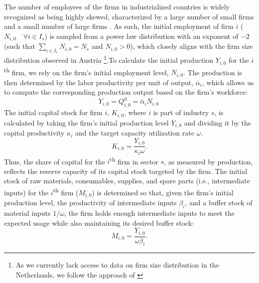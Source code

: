 The number of employees of the firms in industrialized countries is widely recognized as being highly skewed, characterized by a large number of small firms and a small number of large firms \citep{axtell2001zipf}. As such, the initial employment of firm $i$ ($N_{i,0} \quad \forall i \in I_{s}$) is sampled from a power law distribution with an exponent of $-2$ (such that $\sum_{i \in I_{s}} N_{i,0} = N_{s}$ and $N_{i,0}>0$), which closely aligns with the firm size distribution observed in Austria \footnote{As we currently lack access to data on firm size distribution in the Netherlands, we follow the approach of \cite{poledna_economic_2019}}.To calculate the initial production $Y_{i,0}$ for the $i$ \textsuperscript{th} firm, we rely on the firm’s initial employment level, $N_{i,0}$. The production is then determined by the labor productivity per unit of output, $\bar{\alpha}_{i}$, which allows us to compute the corresponding production output based on the firm’s workforce:
\begin{equation*} 
	Y_{i,0} = Q^{\mathrm{d}}_{i,0} = \bar{\alpha}_{i} N_{i,0} \ 
\end{equation*}
The initial capital stock for firm $i$, $K_{i,0}$, where $i$ is part of industry $s$, is calculated by taking the firm’s initial production level $Y_{i,0}$ and dividing it by the capital productivity $\kappa_{i}$ and the target capacity utilization rate $\omega$. 
\begin{equation*} 
	K_{i,0}=\frac{Y_{i,0}}{\kappa_{i}\omega}.
\end{equation*}
Thus, the share of capital for the $i$\textsuperscript{th} firm in sector $s$, as measured by production, reflects the reserve capacity of its capital stock targeted by the firm. The initial stock of raw materials, consumables, supplies, and spare parts (i.e., intermediate inputs) for the $i$\textsuperscript{th} firm ($M_{i,0}$) is determined so that, given the firm’s initial production level, the productivity of intermediate inputs $\beta_{i}$, and a buffer stock of material inputs $1/\omega$, the firm holds enough intermediate inputs to meet the expected usage while also maintaining its desired buffer stock:
\begin{equation*} 
	M_{i,0}=\frac{Y_{i,0}}{\omega \beta_{i}}.
\end{equation*}

